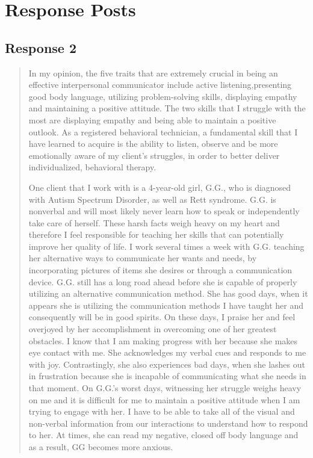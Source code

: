 
\section{Response Posts}
  \subsection{Response 2}
    \begin{quotation}
      In my opinion, the five traits that are extremely crucial in being an
        effective interpersonal communicator include active listening,presenting
        good body language, utilizing problem-solving skills, displaying empathy
        and maintaining a positive attitude. The two skills that I struggle with
        the most are displaying empathy and being able to maintain a positive
        outlook. As a registered behavioral technician, a fundamental skill that
        I have learned to acquire is the ability to listen, observe and be more
        emotionally aware of my client’s struggles, in order to better deliver
        individualized, behavioral therapy.

      One client that I work with is a 4-year-old girl, G.G., who is diagnosed
        with Autism Spectrum Disorder, as well as Rett syndrome. G.G. is
        nonverbal and will most likely never learn how to speak or independently
        take care of herself.  These harsh facts weigh heavy on my heart and
        therefore I feel responsible for teaching her skills that can
        potentially improve her quality of life.  I work several times a week
        with G.G. teaching her alternative ways to communicate her wants and
        needs, by incorporating pictures of items she desires or through a
        communication device. G.G. still has a long road ahead before she is
        capable of properly utilizing an alternative communication method.
        She has good days, when it appears she is utilizing the communication
        methods I have taught her and consequently will be in good spirits. On
        these days, I praise her and feel overjoyed by her accomplishment in
        overcoming one of her greatest obstacles.  I know that I am making
        progress with her because she makes eye contact with me. She
        acknowledges my verbal cues and responds to me with joy. Contrastingly,
        she also experiences bad days, when she lashes out in frustration
        because she is incapable of communicating what she needs in that moment.
        On G.G.’s worst days, witnessing her struggle weighs heavy on me and it
        is difficult for me to maintain a positive attitude when I am trying to
        engage with her.  I have to be able to take all of the visual and
        non-verbal information from our interactions to understand how to
        respond to her. At times, she can read my negative, closed off body
        language and as a result, GG becomes more anxious.


\end{quotation}
